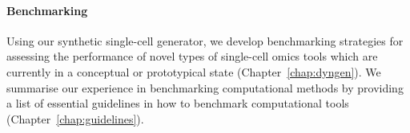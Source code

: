 \paragraph{Benchmarking} Using our synthetic single-cell generator, we develop benchmarking strategies for assessing the performance of novel types of single-cell omics tools which are currently in a conceptual or prototypical state (Chapter~\ref{chap:dyngen}). We summarise our experience in benchmarking computational methods by providing a list of essential guidelines in how to benchmark computational tools (Chapter~\ref{chap:guidelines}).


